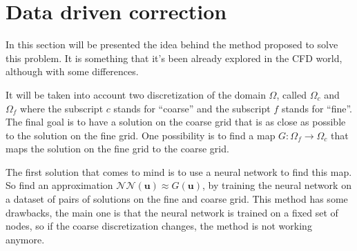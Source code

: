 \section{Data driven correction}
\label{sec:neural_network}

In this section will be presented the idea behind the method proposed to solve this problem. It is something that it's been already explored in the CFD world, although with some differences. 

It will be taken into account two discretization of the domain \(\Omega\), called \(\Omega_c\) and \(\Omega_f\) where the subscript \(c\) stands for ``coarse'' and the subscript \(f\) stands for ``fine''. The final goal is to have a solution on the coarse grid that is as close as possible to the solution on the fine grid. One possibility is to find a map \(G: \Omega_f \rightarrow \Omega_c\) that maps the solution on the fine grid to the coarse grid. 

The first solution that comes to mind is to use a neural network to find this map. So find an approximation \(\mathcal{NN}(\bm{u}) \approx G(\bm{u})\), by training the neural network on a dataset of pairs of solutions on the fine and coarse grid. This method has some drawbacks, the main one is that the neural network is trained on a fixed set of nodes, so if the coarse discretization changes, the method is not working anymore. 